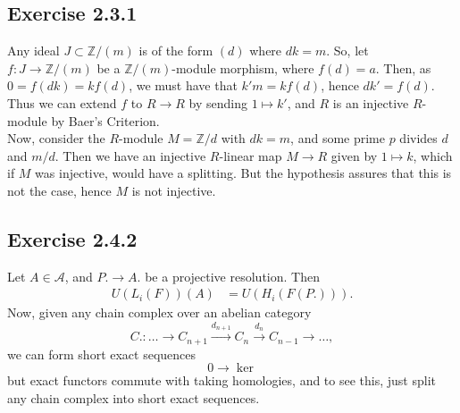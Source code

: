 \documentclass{article}
\theoremstyle{definition}
\newcommand{\Z}{\mathbb{Z}}
\begin{document}
\subsection*{Exercise 2.3.1}

Any ideal $J \subset \Z/(m)$ is of the form $(d)$ where $dk = m$. So, let $f :
J \to \Z/(m)$ be a $\Z/(m)$-module morphism, where $f(d) = a$. Then, as $0 =
f(dk) = kf(d)$, we must have that $k'm = kf(d)$, hence $dk' = f(d)$. Thus we
can extend $f$ to $R \to R$ by sending $1 \mapsto k'$, and $R$ is an injective
$R$-module by Baer's Criterion. \\

Now, consider the $R$-module $M = \Z/d$ with $dk = m$, and some prime $p$
divides $d$ and $m/d$. Then we have an injective $R$-linear map $M \to R$ given
by $1 \mapsto k$, which if $M$ was injective, would have a splitting. But the
hypothesis assures that this is not the case, hence $M$ is not injective.

\subsection*{Exercise 2.4.2}

Let $A \in \mathcal{A}$, and $P. \to A.$ be a projective resolution. Then 
\begin{align*}
	U(L_i(F))(A)
	&=
	U(H_i(F(P.))).
\end{align*}
Now, given any chain complex over an abelian category
\[
	C. : 
	\ldots \rightarrow 
	C_{n + 1} \xrightarrow{d_{n + 1}}
	C_{n} \xrightarrow{d_{n}}
	C_{n - 1} \rightarrow
	\ldots,
\] 
we can form short exact sequences  
\[
	0 \rightarrow
	\ker
\] 
but exact functors commute with taking homologies, and to see this, just split any
chain complex into short exact sequences. 
\end{document}
